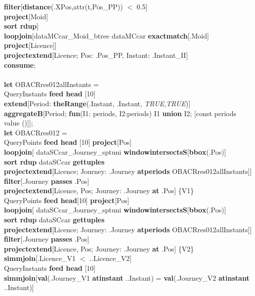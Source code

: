 \documentclass[a4paper]{article}
\newcommand{\op}[1]{\textbf{#1}}
\newcommand{\true}{\textsl{TRUE}}
\begin{document}
\begin{scriptsize}
\begin{tabbing}
\>\>\op{filter}[\op{distance}(.XPos,attr(t,Pos\_PP)) $<$ 0.5]\\
\>\>\op{project}[Moid]\\
\>\>\op{sort rdup}]\\
\>\op{loopjoin}[dataMCcar\_Moid\_btree dataMCcar \op{exactmatch}[.Moid]\\
\>\>\op{project}[Licence]]\\
\>\op{projectextend}[Licence; Pos: .Pos\_PP, Instant: .Instant\_II]\\
\op{consume};\\
\\
\op{let} OBACRres012allInstants =\\
\>QueryInstants \op{feed head} [10]\\
\>\op{extend}[Period: \op{theRange}(.Instant, .Instant, \true{},\true{})]\\
\>\op{aggregateB}[Period; \op{fun}(I1: periods, I2:periods) I1 \op{union} I2; [const periods value ()]];\\
\op{let} OBACRres012 =\\
\>QueryPoints \op{feed head} [10] \op{project}[Pos]\\
\>\>\op{loopjoin}[ dataSCcar\_Journey\_sptuni \op{windowintersectsS}[\op{bbox}(.Pos)]\\
\>\>\>\op{sort rdup} dataSCcar \op{gettuples}\\
\>\>\>\op{projectextend}[Licence; Journey: .Journey \op{atperiods} OBACRres012allInstants]]\\
\>\>\op{filter}[.Journey \op{passes} .Pos]\\
\>\>\op{projectextend}[Licence, Pos; Journey: .Journey \op{at} .Pos] \{V1\}\\
\>QueryPoints \op{feed head}[10] \op{project}[Pos]\\
\>\>\op{loopjoin}[ dataSCcar\_Journey\_sptuni \op{windowintersectsS}[\op{bbox}(.Pos)]\\
\>\>\>\op{sort rdup} dataSCcar \op{gettuples}\\
\>\>\>\op{projectextend}[Licence; Journey: .Journey \op{atperiods} OBACRres012allInstants]]\\
\>\>\op{filter}[.Journey \op{passes} .Pos]\\
\>\>\op{projectextend}[Licence, Pos; Journey: .Journey \op{at} .Pos] \{V2\}\\
\>\op{simmjoin}[.Licence\_V1 $<$ ..Licence\_V2]\\
\>QueryInstants \op{feed head} [10]\\
\>\op{simmjoin}[\op{val}(.Journey\_V1 \op{atinstant} ..Instant) = \op{val}(.Journey\_V2 \op{atinstant} ..Instant)]\\

\end{tabbing}
\end{scriptsize}
\end{document}
